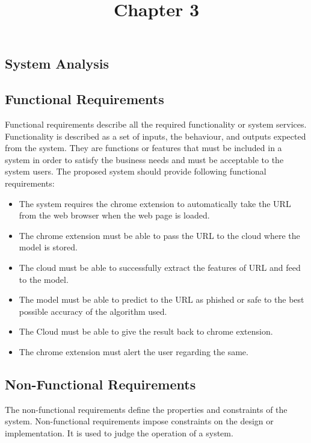 \documentclass[12pt]{article}
\title{\textbf{Chapter 3}\vspace{-6ex}}
\begin{document}
\maketitle

\setcounter{page}{8}

\begin{center}
\section{System Analysis}
\end{center}

\setcounter{section}{3}
\subsection{Functional Requirements}
Functional requirements describe all the required functionality or system services. Functionality is described as a set of inputs, the behaviour, and outputs expected from the system. They are functions or features that must be included in a system in order to satisfy the business needs and must be acceptable to the system users.\newline
The proposed system should provide following functional requirements:
\begin{itemize}
    \item The system requires the chrome extension to automatically take the URL from the web browser when the web page is loaded.
    \item The chrome extension must be able to pass the URL to the cloud where the model is stored.
    \item The cloud must be able to successfully extract the features of URL and feed to the model.
    \item The model must be able to predict to the URL as phished or safe to the best possible accuracy of the algorithm used.
    \item The Cloud must be able to give the result back to chrome extension.
    \item The chrome extension must alert the user regarding the same.
\end{itemize}

\subsection{Non-Functional Requirements}
The non-functional requirements define the properties and constraints of the system. Non-functional requirements impose constraints on the design or implementation. It is used to judge the operation of a system.
\end{document}
